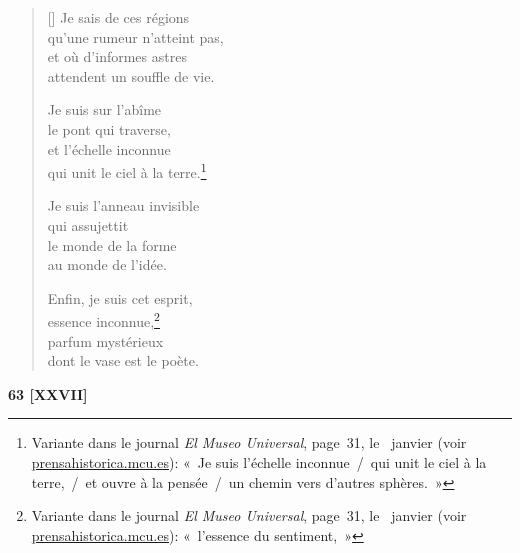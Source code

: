 \documentclass[a4paper,12pt]{book}
\begin{document}
\begin{verse}[\versewidth]
  Je sais de ces régions \\
  qu'une rumeur n'atteint pas, \\
  et où d'informes astres \\
  attendent un souffle de vie.

  Je suis sur l'abîme \\
  le pont qui traverse, \\
  et l'échelle inconnue \\
  qui unit le ciel à la terre.\footnote{Variante dans le journal
  \emph{El Museo Universal}, page~31, le~ janvier  (voir
  \url{prensahistorica.mcu.es}): «~Je suis l'échelle inconnue~/~qui unit
  le ciel à la terre,~/~et ouvre à la pensée~/~un chemin vers d'autres
  sphères.~»}

  Je suis l'anneau invisible \\
  qui assujettit \\
  le monde de la forme \\
  au monde de l'idée.

  Enfin, je suis cet esprit, \\
  essence inconnue,\footnote{Variante dans le journal
  \emph{El Museo Universal}, page~31, le~ janvier  (voir
  \url{prensahistorica.mcu.es}): «~l'essence du sentiment,~»} \\
  parfum mystérieux \\
  dont le vase est le poète.
\end{verse}

\bigskip

\begin{center}
  \textbf{63 [XXVII]}
\end{center}

\settowidth{\versewidth}{Éveillée, tu regardes et, en regardant, tes yeux}
\end{document}
